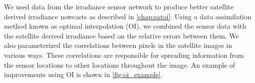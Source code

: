 We used data from the irradiance sensor network to produce better
satellite derived irradiance nowcasts as described in
\cref{chap:satoi}.
Using a data assimilation method known as optimal interpolation (OI),
we combined the sensor data with the satellite derived irradiance
based on the relative errors between them.
We also parameterized the correlations between pixels in the satellite
images in various ways.
These correlations are responsible for spreading information from the
sensor locations to other locations throughout the image.
An example of improvements using OI is shown in \cref{fig:oi_example}.


\begin{figure}[htbp]
\centering
\captionsetup[subfigure]{labelformat=empty}
\vspace{-1em}\\

\end{figure}
